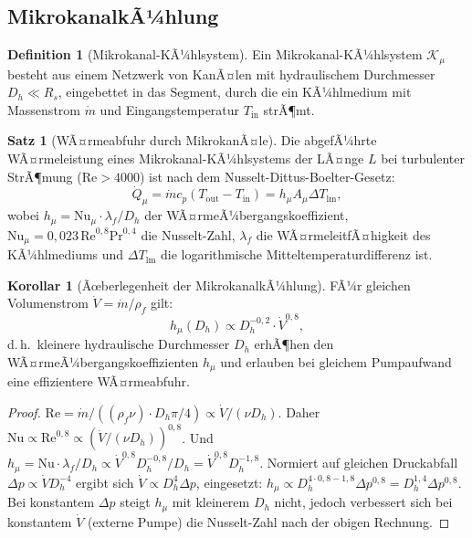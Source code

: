 ﻿\documentclass[a4paper,12pt]{article}
\theoremstyle{definition}
\newtheorem{definition}{Definition}
\newtheorem{satz}{Satz}
\newtheorem{korollar}{Korollar}
\begin{document}
\subsection{MikrokanalkÃ¼hlung}
\label{sec:kuehlung}

\begin{definition}[Mikrokanal-KÃ¼hlsystem]
Ein Mikrokanal-KÃ¼hlsystem $\mathcal{K}_{\mu}$ besteht aus einem Netzwerk von
KanÃ¤len mit hydraulischem Durchmesser $D_h \ll R_s$, eingebettet in das Segment,
durch die ein KÃ¼hlmedium mit Massenstrom $\dot{m}$ und Eingangstemperatur $T_{\mathrm{in}}$
strÃ¶mt.
\end{definition}

\begin{satz}[WÃ¤rmeabfuhr durch MikrokanÃ¤le]
\label{satz:mikrokuehl}
Die abgefÃ¼hrte WÃ¤rmeleistung eines Mikrokanal-KÃ¼hlsystems der LÃ¤nge $L$ bei turbulenter
StrÃ¶mung ($\mathrm{Re} > 4000$) ist nach dem Nusselt-Dittus-Boelter-Gesetz:
\begin{equation}
\label{eq:mikrokuehl}
\dot{Q}_{\mu} = \dot{m} c_p (T_{\mathrm{out}} - T_{\mathrm{in}}) = h_{\mu} A_{\mu} \Delta T_{\mathrm{lm}},
\end{equation}
wobei $h_{\mu} = \mathrm{Nu}_{\mu} \cdot \lambda_f / D_h$ der WÃ¤rmeÃ¼bergangskoeffizient,
$\mathrm{Nu}_{\mu} = 0{,}023\,\mathrm{Re}^{0{,}8}\mathrm{Pr}^{0{,}4}$ die Nusselt-Zahl,
$\lambda_f$ die WÃ¤rmeleitfÃ¤higkeit des KÃ¼hlmediums und $\Delta T_{\mathrm{lm}}$ die
logarithmische Mitteltemperaturdifferenz ist.
\end{satz}

\begin{korollar}[Ãœberlegenheit der MikrokanalkÃ¼hlung]
\label{kor:mikro}
FÃ¼r gleichen Volumenstrom $\dot{V} = \dot{m}/\rho_f$ gilt:
\[
h_{\mu}(D_h) \propto D_h^{-0{,}2} \cdot \dot{V}^{0{,}8},
\]
d.\,h.\ kleinere hydraulische Durchmesser $D_h$ erhÃ¶hen den WÃ¤rmeÃ¼bergangskoeffizienten $h_{\mu}$
und erlauben bei gleichem Pumpaufwand eine effizientere WÃ¤rmeabfuhr.
\end{korollar}

\begin{proof}
$\mathrm{Re} = \dot{m}/((\rho_f \nu) \cdot D_h \pi/4) \propto \dot{V}/(\nu D_h)$.
Daher $\mathrm{Nu} \propto \mathrm{Re}^{0{,}8} \propto (\dot{V}/(\nu D_h))^{0{,}8}$.
Und $h_{\mu} = \mathrm{Nu}\cdot\lambda_f/D_h \propto \dot{V}^{0{,}8} D_h^{-0{,}8}/D_h = \dot{V}^{0{,}8} D_h^{-1{,}8}$.
Normiert auf gleichen Druckabfall $\Delta p \propto \dot{V} D_h^{-4}$ ergibt sich
$\dot{V} \propto D_h^4 \Delta p$, eingesetzt: $h_{\mu} \propto D_h^{4\cdot 0{,}8 - 1{,}8} \Delta p^{0{,}8} = D_h^{1{,}4}\Delta p^{0{,}8}$.
Bei konstantem $\Delta p$ steigt $h_{\mu}$ mit kleinerem $D_h$ nicht, jedoch verbessert
sich bei konstantem $\dot{V}$ (externe Pumpe) die Nusselt-Zahl nach der obigen Rechnung.
\end{proof}
\end{document}
